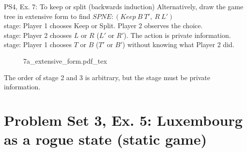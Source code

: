 \begin{frame}{PS4, Ex. 7: To keep or split (backwards induction)}
  Alternatively, draw the game tree in extensive form to find $SPNE:(Keep\ B\ T',\ R\ L')$\\\medskip
   stage: Player 1 chooses Keep or Split. Player 2 observes the choice.\\\medskip
   stage: Player 2 chooses $L$ or $R$ ($L'$ or $R'$). The action is private information.\\\medskip
   stage: Player 1 chooses $T$ or $B$ ($T'$ or $B'$) without knowing what Player 2 did.\\\medskip
  \begin{figure}[!h]
    \begin{center}
    \def\svgwidth{\columnwidth}
    {7a_extensive_form.pdf_tex}
    \end{center}
  \end{figure}
  \vspace{-8pt}
  The order of stage 2 and 3 is arbitrary, but the  stage must be private information.
\end{frame}


\section{Problem Set 3, Ex. 5: Luxembourg as a rogue state (static game)}

